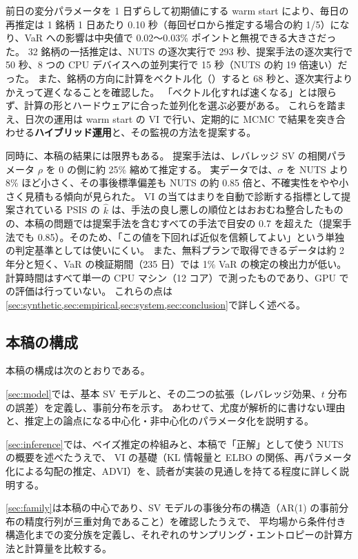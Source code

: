 \begin{enumerate}[label=(\roman*)]
    前日の変分パラメータを 1 日ずらして初期値にする warm start により、毎日の再推定は 1 銘柄 1 日あたり 0.10 秒（毎回ゼロから推定する場合の約 1/5）になり、VaR への影響は中央値で 0.02〜0.03\% ポイントと無視できる大きさだった。
    32 銘柄の一括推定は、NUTS の逐次実行で 293 秒、提案手法の逐次実行で 50 秒、8 つの CPU デバイスへの並列実行で 15 秒（NUTS の約 19 倍速い）だった。
    また、銘柄の方向に計算をベクトル化（）すると 68 秒と、逐次実行よりかえって遅くなることを確認した。
    「ベクトル化すれば速くなる」とは限らず、計算の形とハードウェアに合った並列化を選ぶ必要がある。
    これらを踏まえ、日次の運用は warm start の VI で行い、定期的に MCMC で結果を突き合わせる\textbf{ハイブリッド運用}と、その監視の方法を提案する。
\end{enumerate}

同時に、本稿の結果には限界もある。
提案手法は、レバレッジ SV の相関パラメータ $\rho$ を 0 の側に約 25\% 縮めて推定する。
実データでは、$\sigma$ を NUTS より 8\% ほど小さく、その事後標準偏差も NUTS の約 0.85 倍と、不確実性をやや小さく見積もる傾向が見られた。
VI の当てはまりを自動で診断する指標として提案されている PSIS の $\hat k$ は、手法の良し悪しの順位とはおおむね整合したものの、本稿の問題では提案手法を含むすべての手法で目安の 0.7 を超えた（提案手法でも 0.85）。そのため、「この値を下回れば近似を信頼してよい」という単独の判定基準としては使いにくい。
また、無料プランで取得できるデータは約 2 年分と短く、VaR の検証期間（235 日）では 1\% VaR の検定の検出力が低い。
計算時間はすべて単一の CPU マシン（12 コア）で測ったものであり、GPU での評価は行っていない。
これらの点は\cref{sec:synthetic,sec:empirical,sec:system,sec:conclusion}で詳しく述べる。

\subsection{本稿の構成}\label{sec:intro-outline}

本稿の構成は次のとおりである。

\cref{sec:model}では、基本 SV モデルと、その二つの拡張（レバレッジ効果、$t$ 分布の誤差）を定義し、事前分布を示す。
あわせて、尤度が解析的に書けない理由と、推定上の論点になる中心化・非中心化のパラメータ化を説明する。

\cref{sec:inference}では、ベイズ推定の枠組みと、本稿で「正解」として使う NUTS の概要を述べたうえで、
VI の基礎（KL 情報量と ELBO の関係、再パラメータ化による勾配の推定、ADVI）を、読者が実装の見通しを持てる程度に詳しく説明する。

\cref{sec:family}は本稿の中心であり、SV モデルの事後分布の構造（AR(1) の事前分布の精度行列が三重対角であること）を確認したうえで、
平均場から条件付き構造化までの変分族を定義し、それぞれのサンプリング・エントロピーの計算方法と計算量を比較する。

